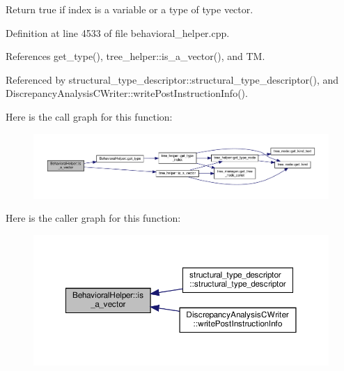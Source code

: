 Return true if index is a variable or a type of type vector. 



Definition at line 4533 of file behavioral\+\_\+helper.\+cpp.



References get\+\_\+type(), tree\+\_\+helper\+::is\+\_\+a\+\_\+vector(), and TM.



Referenced by structural\+\_\+type\+\_\+descriptor\+::structural\+\_\+type\+\_\+descriptor(), and Discrepancy\+Analysis\+C\+Writer\+::write\+Post\+Instruction\+Info().

Here is the call graph for this function\+:
\nopagebreak
\begin{figure}[H]
\begin{center}
\leavevmode
\includegraphics[width=350pt]{dd/db2/classBehavioralHelper_a3aaba4321f615da5c2e5d35de11344b6_cgraph}
\end{center}
\end{figure}
Here is the caller graph for this function\+:
\nopagebreak
\begin{figure}[H]
\begin{center}
\leavevmode
\includegraphics[width=350pt]{dd/db2/classBehavioralHelper_a3aaba4321f615da5c2e5d35de11344b6_icgraph}
\end{center}
\end{figure}
\mbox{\label{classBehavioralHelper_a4127bd7bc6af18101f77ac5f68d6af60}} 
